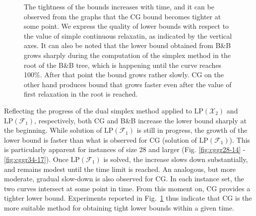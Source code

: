 \begin{figure}[!htb]
{{	The tightness of the bounds increases with time, and it can be observed from the graphs that the CG bound becomes tighter at some point.
	We express the quality of lower bounds with respect to the value of simple continuous relaxatin, as indicated by the vertical axes.
	It can also be noted that the lower bound obtained from B\&B grows sharply during the computation of the simplex method in the root of the B\&B tree, 
	which is happening until the curve reaches 100\%.
	After that point the bound grows rather slowly.
	CG on the other hand produces bound that grows faster even after the value of first relaxation in the root is reached.
	}}
  \label{fig:cggr}
\end{figure} 

Reflecting the progress of the dual simplex method applied to $\text{LP}(\mathcal{X}_2)$ and $\text{LP}(\mathcal{F}_1)$, respectively,
both CG and B\&B increase the lower bound sharply at the beginning. 
While solution of $\text{LP}(\mathcal{F}_1)$ is still in progress, the growth of the lower bound is faster than what is observed for CG (solution of $\text{LP}(\mathcal{F}_1)$). 
This is particularly apparent for instances of size 28 and larger (Fig. \ref{fig:cggr28-14} - \ref{fig:cggr34-17}). %
Once $\text{LP}(\mathcal{F}_1)$ is solved, the increase slows down substantially, and remains modest until the time limit is reached. 
An analogous, but more moderate, gradual slow-down is also observed for CG.
In each instance set, the two curves intersect at some point in time.
From this moment on, CG provides a tighter lower bound.
Experiments reported in Fig.\ \ref{fig:cggr} thus indicate that CG is the more suitable method for obtaining tight lower bounds within a given time.
